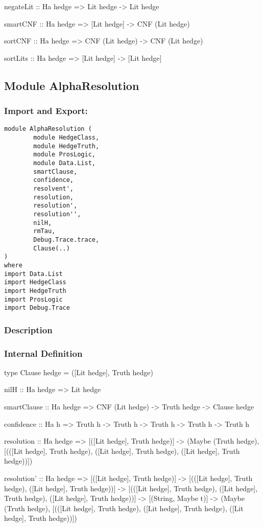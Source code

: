 \documentclass[../gr-final.tex]{subfiles}
\begin{document}
negateLit :: Ha hedge => Lit hedge -> Lit hedge

smartCNF :: Ha hedge => [Lit hedge] -> CNF (Lit hedge)

sortCNF :: Ha hedge => CNF (Lit hedge) -> CNF (Lit hedge)

sortLits :: Ha hedge => [Lit hedge] -> [Lit hedge]

\subsection{Module AlphaResolution}
\subsubsection{Import and Export:}
\begin{lstlisting}
module AlphaResolution (
        module HedgeClass,
        module HedgeTruth,
        module ProsLogic,
        module Data.List,
        smartClause,
        confidence,
        resolvent',
        resolution,
        resolution',
        resolution'',
        nilH,
        rmTau,
        Debug.Trace.trace,
        Clause(..)
)
where
import Data.List
import HedgeClass
import HedgeTruth
import ProsLogic
import Debug.Trace
\end{lstlisting}
\subsubsection{Description}

\subsubsection{Internal Definition}
type Clause hedge = ([Lit hedge], Truth hedge)

nilH :: Ha hedge => Lit hedge

smartClause :: Ha hedge => CNF (Lit hedge) -> Truth hedge ->
Clause hedge

confidence :: Ha h => Truth h -> Truth h -> Truth h -> Truth h ->
Truth h

resolution :: Ha hedge => [([Lit hedge], Truth hedge)] -> (Maybe
(Truth hedge), [(([Lit hedge], Truth hedge), ([Lit hedge], Truth
hedge), ([Lit hedge], Truth hedge))])

resolution' :: Ha hedge => [([Lit hedge], Truth hedge)] ->
[(([Lit hedge], Truth hedge), ([Lit hedge], Truth hedge))] ->
[(([Lit hedge], Truth hedge), ([Lit hedge], Truth hedge), ([Lit
hedge], Truth hedge))] -> [(String, Maybe t)] -> (Maybe (Truth
hedge), [(([Lit hedge], Truth hedge), ([Lit hedge], Truth hedge),
([Lit hedge], Truth hedge))])
\end{document}
